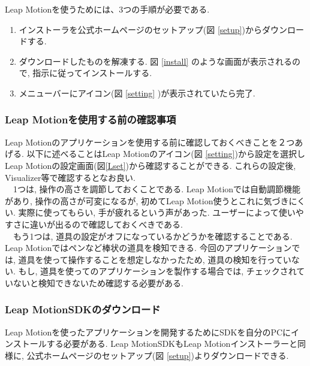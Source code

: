 \documentclass{funthesis}
\begin{document}
Leap Motionを使うためには、3つの手順が必要である. 
\begin{enumerate}
 \item インストーラを公式ホームページのセットアップ(図 \ref{setup})からダウンロードする.
 \item ダウンロードしたものを解凍する. 図 \ref{install} のような画面が表示されるので, 指示に従ってインストールする. 
 \item メニューバーにアイコン(図 \ref{setting} )が表示されていたら完了. 
\end{enumerate}

\subsubsection{Leap Motionを使用する前の確認事項}
Leap Motionのアプリケーションを使用する前に確認しておくべきことを２つあげる. 以下に述べることはLeap Motionのアイコン(図 \ref{setting})から設定を選択しLeap Motionの設定画面(図\ref{Lset})から確認することができる. これらの設定後, Visualizer等で確認するとなお良い. \\
　1つは, 操作の高さを調節しておくことである. Leap Motionでは自動調節機能があり, 操作の高さが可変になるが, 初めてLeap Motion使うとこれに気づきにくい. 実際に使ってもらい, 手が疲れるという声があった. ユーザーによって使いやすさに違いが出るので確認しておくべきである. \\
　もう1つは, 道具の設定がオフになっているかどうかを確認することである. Leap Motionではペンなど棒状の道具を検知できる. 今回のアプリケーションでは, 道具を使って操作することを想定しなかったため, 道具の検知を行っていない. もし, 道具を使ってのアプリケーションを製作する場合では, チェックされていないと検知できないため確認する必要がある. \\

\subsubsection{Leap MotionSDKのダウンロード}
Leap Motionを使ったアプリケーションを開発するためにSDKを自分のPCにインストールする必要がある. Leap MotionSDKもLeap Motionインストーラーと同様に, 公式ホームページのセットアップ(図 \ref{setup})よりダウンロードできる. 
\end{document}
